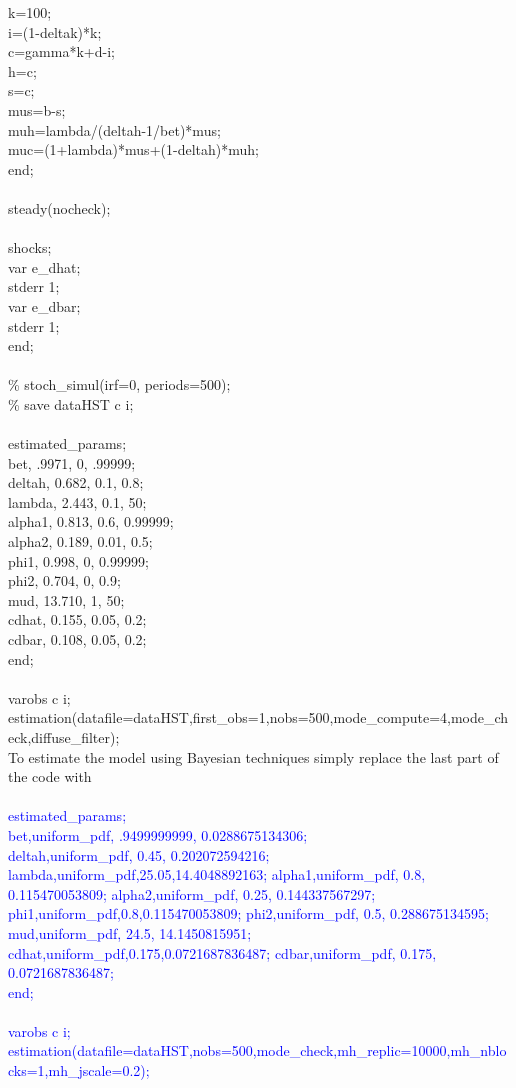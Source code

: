 \documentclass[a4paper,12pt]{scrartcl} %
\begin{document}
{k=100;\\
i=(1-deltak)*k;\\
c=gamma*k+d-i;\\
h=c;\\
s=c;\\
mus=b-s;\\
muh=lambda/(deltah-1/bet)*mus;\\
muc=(1+lambda)*mus+(1-deltah)*muh;\\
end;\\
\\
steady(nocheck);\\
\\
shocks;\\
var e\_dhat;\\
stderr 1;\\
var e\_dbar;\\
stderr 1;\\
end;\\
\\
\% stoch\_simul(irf=0, periods=500);\\
\% save dataHST c i;\\
\\
estimated\_params;\\
bet, .9971, 0, .99999;\\
deltah, 0.682, 0.1, 0.8;\\
lambda, 2.443, 0.1, 50;\\
alpha1, 0.813, 0.6, 0.99999;\\
alpha2, 0.189, 0.01, 0.5;\\
phi1, 0.998, 0, 0.99999;\\
phi2, 0.704, 0, 0.9;\\
mud, 13.710, 1, 50;\\
cdhat, 0.155, 0.05, 0.2;\\
cdbar, 0.108, 0.05, 0.2;\\
end;\\
\\
varobs c i;\\
estimation(datafile=dataHST,first\_obs=1,nobs=500,mode\_compute=4,mode\_check,diffuse\_filter);}\\

To estimate the model using Bayesian techniques simply replace the last part of the code with\\
\\
\textcolor{blue}{
estimated\_params;\\
bet,uniform\_pdf, .9499999999, 0.0288675134306;\\
deltah,uniform\_pdf, 0.45, 0.202072594216;
lambda,uniform\_pdf,25.05,14.4048892163;
alpha1,uniform\_pdf, 0.8, 0.115470053809;
alpha2,uniform\_pdf, 0.25, 0.144337567297;
phi1,uniform\_pdf,0.8,0.115470053809;
phi2,uniform\_pdf, 0.5, 0.288675134595;
mud,uniform\_pdf, 24.5, 14.1450815951;
cdhat,uniform\_pdf,0.175,0.0721687836487;
cdbar,uniform\_pdf, 0.175, 0.0721687836487;\\
end;\\
\\
varobs c i;\\
estimation(datafile=dataHST,nobs=500,mode\_check,mh\_replic=10000,mh\_nblocks=1,mh\_jscale=0.2);}\\
\end{document}
